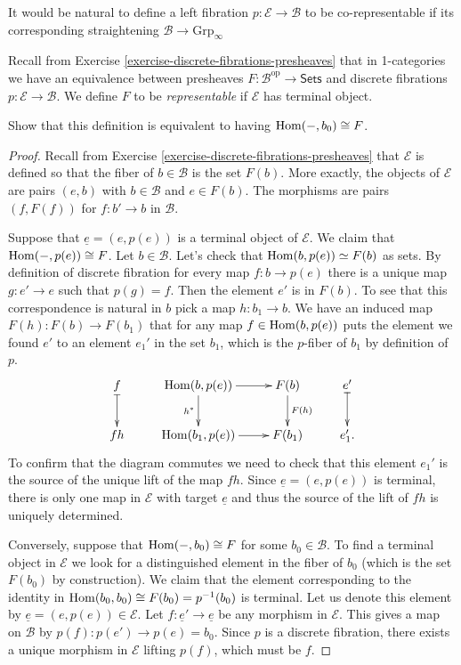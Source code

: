 \medskip\noindent
It would be natural to define a left fibration $p:\mathcal{E} \to \mathcal{B}$ 
to be co-representable if its corresponding straightening
$\mathcal{B} \to \text{Grp}_\infty$

Recall from 
Exercise \ref{exercise-discrete-fibrations-presheaves}
that in 1-categories we have an equivalence between presheaves
$F:\mathcal{B}^{\text{op}}\to \mathsf{Sets}$
and discrete fibrations $p:\mathcal{E} \to \mathcal{B}$.
We define $F$ to be {\it representable} if $\mathcal{E}$ 
has terminal object.

\begin{exercise}
\label{exercise-}
Show that this definition is equivalent to
having $\mathop{\mathrm{Hom}}\nolimits(-,b_0) \cong F$.
\end{exercise}

\begin{proof}
Recall from Exercise \ref{exercise-discrete-fibrations-presheaves}
that $\mathcal{E}$ is defined so that the fiber of $b \in \mathcal{B}$ 
is the set $F(b)$. More exactly, the objects of $\mathcal{E}$
are pairs $(e,b)$ with $b \in \mathcal{B}$ and $e \in F(b)$.
The morphisms are pairs $(f,F(f))$ for $f:b' \to b$ in $\mathcal{B}$.

Suppose that $\underline{e}=(e,p(e))$ is a terminal object of $\mathcal{E}$.
We claim that $\mathop{\mathrm{Hom}}\nolimits(-,p(e))\cong F$.
Let $b \in \mathcal{B}$. Let's check that
$\mathop{\mathrm{Hom}}\nolimits(b,p(e))\simeq F(b)$ as sets.
By definition of discrete
fibration for every map $f:b\to p(e)$ 
there is a unique map $g:e' \to e$ such that $p(g)=f$.
Then the element $e'$ is in $F(b)$.
To see that this correspondence is natural in $b$
pick a map $h:b_1 \to b$.
We have an induced map $F(h):F(b) \to F(b_1)$
that for any map $f \in \mathop{\mathrm{Hom}}\nolimits(b,p(e))$
puts the element we found $e'$
to an element $e_1'$ in the set $b_1$,
which is the $p$-fiber of $b_1$ by definition of $p$.
$$
\xymatrix{
f\ar@{|->}[d]&\Hom(b,p(e))\ar[r]\ar[d]_{h^*}&F(b)\ar[d]^{F(h)}&e'\ar@{|->}[d]\\
fh&\Hom(b_1,p(e))\ar[r]&F(b_1)& e_1'.
}
$$
To confirm that the diagram commutes we need to check
that this element $e_1'$ is the source of the unique
lift of the map $fh$. Since $\underline{e}=(e,p(e))$ is terminal,
there is only one map in $\mathcal{E}$
with target $\underline{e}$ and thus 
the source of the lift of $fh$ is uniquely determined.

Conversely, suppose that $\mathop{\mathrm{Hom}}\nolimits(-,b_0)\cong F$ for some $b_0 \in \mathcal{B}$.
To find a terminal object in $\mathcal{E}$ we look
for a distinguished element in the fiber of $b_0$
(which is the set $F(b_0)$ by construction).
We claim that the element corresponding to the identity
in $\mathop{\mathrm{Hom}}\nolimits(b_0,b_0)\cong F(b_0)=p^{-1}(b_0)$
is terminal. Let us denote this element by 
$\underline{e}=(e,p(e)) \in \mathcal{E}$.
Let $f:\underline{e}' \to \underline{e}$ be any morphism in $\mathcal{E}$.
This gives a map on $\mathcal{B}$ by $p(f):p(e')\to p(e)=b_0$.
Since $p$ is a discrete fibration, there exists a unique morphism
in $\mathcal{E}$ lifting $p(f)$, which must be $f$.
\end{proof}

